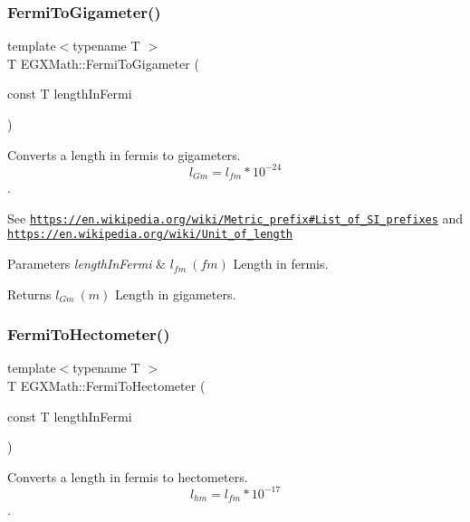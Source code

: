 \subsubsection{\texorpdfstring{Fermi\+To\+Gigameter()}{FermiToGigameter()}}
{\footnotesize\ttfamily template$<$typename T $>$ \\
T E\+G\+X\+Math\+::\+Fermi\+To\+Gigameter (\begin{DoxyParamCaption}\item[{const T}]{length\+In\+Fermi }\end{DoxyParamCaption})}



Converts a length in fermis to gigameters. \[ l_{Gm}=l_{fm} * 10^{-24} \]. 

See \href{https://en.wikipedia.org/wiki/Metric_prefix#List_of_SI_prefixes}{\tt https\+://en.\+wikipedia.\+org/wiki/\+Metric\+\_\+prefix\#\+List\+\_\+of\+\_\+\+S\+I\+\_\+prefixes} and \href{https://en.wikipedia.org/wiki/Unit_of_length}{\tt https\+://en.\+wikipedia.\+org/wiki/\+Unit\+\_\+of\+\_\+length} 
\begin{DoxyParams}{Parameters}
{\em length\+In\+Fermi} & $ l_{fm}\ (fm)$ Length in fermis. \\
\hline
\end{DoxyParams}
\begin{DoxyReturn}{Returns}
$ l_{Gm}\ (m)$ Length in gigameters. 
\end{DoxyReturn}
\mbox{\label{group___e_g_x_math-_conversions-_length_conversions-_non-_s_i-_fermi-_s_i_ga0412e30a3ebf380fdde7f67793d35ebd}} 
\subsubsection{\texorpdfstring{Fermi\+To\+Hectometer()}{FermiToHectometer()}}
{\footnotesize\ttfamily template$<$typename T $>$ \\
T E\+G\+X\+Math\+::\+Fermi\+To\+Hectometer (\begin{DoxyParamCaption}\item[{const T}]{length\+In\+Fermi }\end{DoxyParamCaption})}



Converts a length in fermis to hectometers. \[ l_{hm}=l_{fm} * 10^{-17} \]. 

